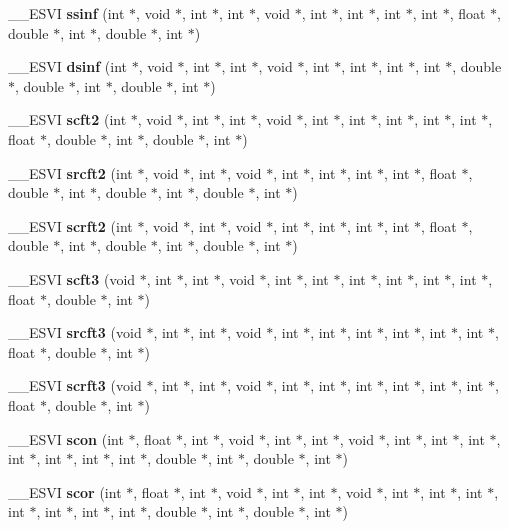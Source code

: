 \begin{CompactItemize}
\item 
\_\-\_\-ESVI {\bf ssinf} (int $\ast$, void $\ast$, int $\ast$, int $\ast$, void $\ast$, int $\ast$, int $\ast$, int $\ast$, int $\ast$, float $\ast$, double $\ast$, int $\ast$, double $\ast$, int $\ast$)
\item 
\_\-\_\-ESVI {\bf dsinf} (int $\ast$, void $\ast$, int $\ast$, int $\ast$, void $\ast$, int $\ast$, int $\ast$, int $\ast$, int $\ast$, double $\ast$, double $\ast$, int $\ast$, double $\ast$, int $\ast$)
\item 
\_\-\_\-ESVI {\bf scft2} (int $\ast$, void $\ast$, int $\ast$, int $\ast$, void $\ast$, int $\ast$, int $\ast$, int $\ast$, int $\ast$, int $\ast$, float $\ast$, double $\ast$, int $\ast$, double $\ast$, int $\ast$)
\item 
\_\-\_\-ESVI {\bf srcft2} (int $\ast$, void $\ast$, int $\ast$, void $\ast$, int $\ast$, int $\ast$, int $\ast$, int $\ast$, float $\ast$, double $\ast$, int $\ast$, double $\ast$, int $\ast$, double $\ast$, int $\ast$)
\item 
\_\-\_\-ESVI {\bf scrft2} (int $\ast$, void $\ast$, int $\ast$, void $\ast$, int $\ast$, int $\ast$, int $\ast$, int $\ast$, float $\ast$, double $\ast$, int $\ast$, double $\ast$, int $\ast$, double $\ast$, int $\ast$)
\item 
\_\-\_\-ESVI {\bf scft3} (void $\ast$, int $\ast$, int $\ast$, void $\ast$, int $\ast$, int $\ast$, int $\ast$, int $\ast$, int $\ast$, int $\ast$, float $\ast$, double $\ast$, int $\ast$)
\item 
\_\-\_\-ESVI {\bf srcft3} (void $\ast$, int $\ast$, int $\ast$, void $\ast$, int $\ast$, int $\ast$, int $\ast$, int $\ast$, int $\ast$, int $\ast$, float $\ast$, double $\ast$, int $\ast$)
\item 
\_\-\_\-ESVI {\bf scrft3} (void $\ast$, int $\ast$, int $\ast$, void $\ast$, int $\ast$, int $\ast$, int $\ast$, int $\ast$, int $\ast$, int $\ast$, float $\ast$, double $\ast$, int $\ast$)
\item 
\_\-\_\-ESVI {\bf scon} (int $\ast$, float $\ast$, int $\ast$, void $\ast$, int $\ast$, int $\ast$, void $\ast$, int $\ast$, int $\ast$, int $\ast$, int $\ast$, int $\ast$, int $\ast$, int $\ast$, double $\ast$, int $\ast$, double $\ast$, int $\ast$)
\item 
\_\-\_\-ESVI {\bf scor} (int $\ast$, float $\ast$, int $\ast$, void $\ast$, int $\ast$, int $\ast$, void $\ast$, int $\ast$, int $\ast$, int $\ast$, int $\ast$, int $\ast$, int $\ast$, int $\ast$, double $\ast$, int $\ast$, double $\ast$, int $\ast$)

\end{CompactItemize}
